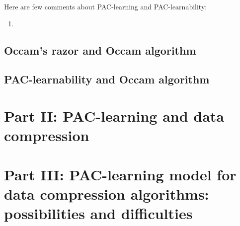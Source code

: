 \documentclass[12pt]{article}
\begin{document}
Here are few comments about PAC-learning and PAC-learnability:

\begin{enumerate}
  \item 
\end{enumerate}

\subsection{Occam's razor and Occam algorithm}



\subsection{PAC-learnability and Occam algorithm}




\section{Part II: PAC-learning and data compression}




\section{Part III: PAC-learning model for data compression algorithms: possibilities and difficulties}

\end{document}
